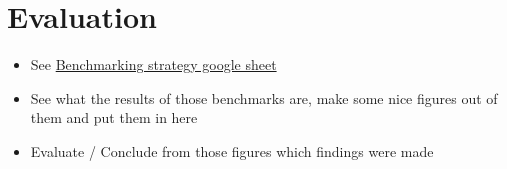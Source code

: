 \section{Evaluation}

\begin{itemize}
\item See \href{https://drive.google.com/drive/folders/1KhEb6TT2YXKUlSJx2sdfR44ZhWUSHnXN}{Benchmarking strategy google sheet}
\item See what the results of those benchmarks are, make some nice figures out of them and put them in here
\item Evaluate / Conclude from those figures which findings were made
\end{itemize}


